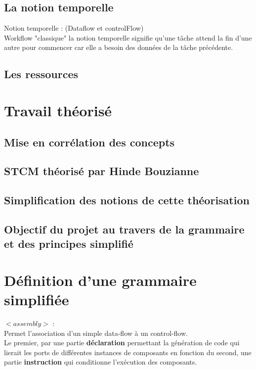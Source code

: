 \documentclass{article}
\begin{document}
\subsection{La notion temporelle}
Notion temporelle : (Dataflow et controlFlow)\\
    Workflow "classique" la notion temporelle signifie qu'une tâche attend la fin d'une autre pour commencer car elle a besoin des données de la tâche précédente.
\subsection{Les ressources}
\section{Travail théorisé}
\subsection{Mise en corrélation des concepts}
\subsection{STCM théorisé par Hinde Bouzianne}
\subsection{Simplification des notions de cette théorisation}
\subsection{Objectif du projet au travers de la grammaire et des principes simplifié}
\fi





\section{Définition d'une grammaire simplifiée}
$<assembly>$ :\\
Permet l'association d'un simple data-flow à un control-flow.\\
Le premier, par une partie \textbf{déclaration} permettant la génération de code qui lierait les ports de différentes instances de composants en fonction du second, une partie \textbf{instruction} qui conditionne l'exécution des composants.\\
\end{document}
